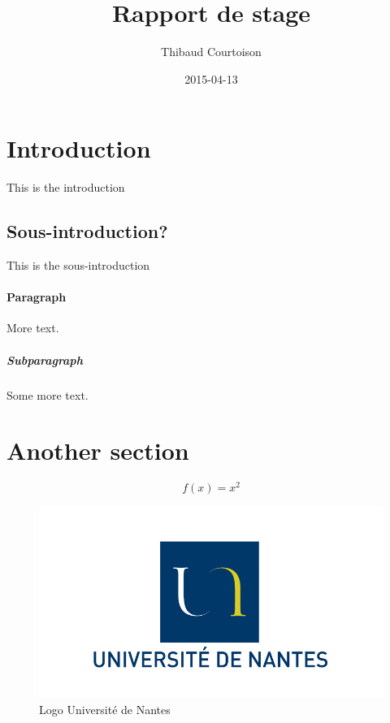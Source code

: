 \documentclass{article}
\title{Rapport de stage}
\date{2015-04-13}
\author{Thibaud Courtoison}
\begin{document}
    \maketitle
    \newpage
    
    \section{Introduction}
    
    This is the introduction
    
    \subsection{Sous-introduction?}
    
    This is the sous-introduction
    
    \paragraph{Paragraph}
    
    More text.
    
    \subparagraph{Subparagraph}
    
    Some more text.
    
    \section{Another section}
    
    \begin{equation*}
        f(x) = x^2
    \end{equation*}
    
    \begin{figure}
        \includegraphics[width=\linewidth]{img/logoUniv.jpg}
        \caption{Logo Université de Nantes}
        \label{fiog:logoUniv}
    \end{figure}
    
\end{document}
